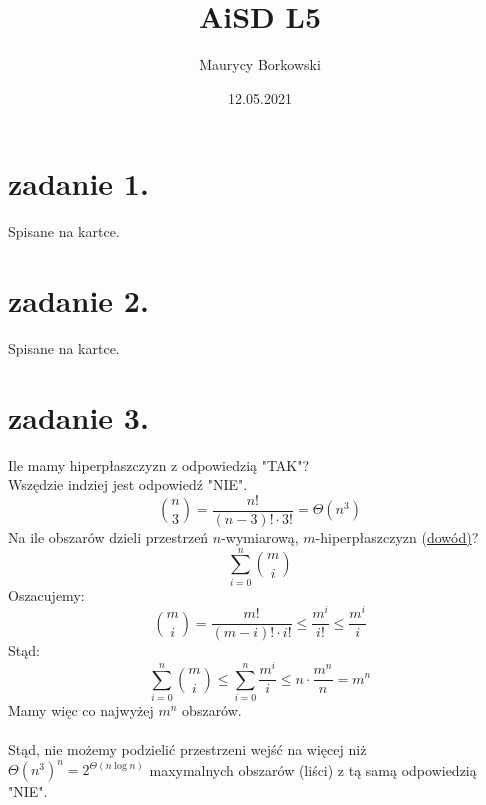 \documentclass{article}
\title{AiSD L5}
\date{12.05.2021}
\author{Maurycy Borkowski}
\begin{document}
\maketitle
\section{zadanie 1.}
Spisane na kartce.
\section{zadanie 2.}
Spisane na kartce.
\clearpage
\section{zadanie 3.}
Ile mamy hiperpłaszczyzn z odpowiedzią "TAK"?\\
Wszędzie indziej jest odpowiedź "NIE".
$$
\binom{n}{3} = \frac{n!}{(n-3)!\cdot3!} = \Theta(n^3)
$$
Na ile obszarów dzieli przestrzeń $n$-wymiarową, $m$-hiperpłaszczyzn (\href{https://math.stackexchange.com/questions/409518/how-many-resulting-regions-if-we-partition-mathbbrm-with-n-hyperplanes}{dowód)}?
$$
\sum_{i=0}^{n} \binom{m}{i}
$$
Oszacujemy:
$$
\binom{m}{i} = \frac{m!}{(m-i)!\cdot i!} \leq \frac{m^i}{i!}\leq \frac{m^i}{i}
$$
Stąd:
$$
\sum_{i=0}^{n} \binom{m}{i} \leq \sum_{i=0}^{n} \frac{m^i}{i} \leq n\cdot \frac{m^n}{n} = m^n
$$
Mamy więc co najwyżej $m^n$ obszarów.\\\\
Stąd, nie możemy podzielić przestrzeni wejść na więcej niż\\ $\Theta(n^3)^n = 2^{\Theta(n\log{n})}$ maxymalnych obszarów (liści) z tą samą odpowiedzią "NIE".


\clearpage
\end{document}
